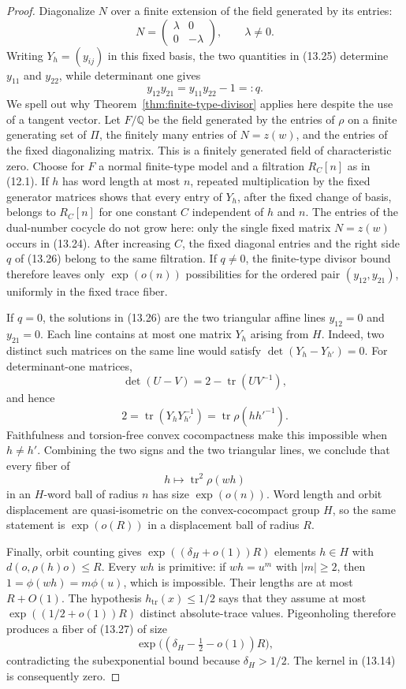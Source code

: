 \documentclass[11pt,reqno]{amsart}
\theoremstyle{definition}
\theoremstyle{remark}
\newcommand{\Q}{\mathbb Q}
\newcommand{\Tr}{\operatorname{tr}}
\begin{document}
\begin{proof}
Diagonalize \(N\) over a finite extension of the field generated by its
entries:
\[
 N=\begin{pmatrix}\lambda&0\\0&-\lambda\end{pmatrix},
 \qquad \lambda\ne0.
\]
Writing \(Y_h=(y_{ij})\) in this fixed basis, the two quantities in
(13.25) determine \(y_{11}\) and \(y_{22}\), while determinant one gives
\[
 y_{12}y_{21}=y_{11}y_{22}-1=:q.
\tag{13.26}
\]
We spell out why Theorem~\ref{thm:finite-type-divisor} applies here despite
the use of a tangent vector.  Let \(F/\Q\) be the field generated by the
entries of \(\rho\) on a finite generating set of \(\Pi\), the finitely
many entries of \(N=z(w)\), and the entries of the fixed diagonalizing
matrix.  This is a finitely generated field of characteristic zero.  Choose
for \(F\) a normal finite-type model and a filtration \(R_C[n]\) as in
(12.1).  If \(h\) has word length at most \(n\), repeated multiplication
by the fixed generator matrices shows that every entry of \(Y_h\), after
the fixed change of basis, belongs to \(R_C[n]\) for one constant \(C\)
independent of \(h\) and \(n\).  The entries of the dual-number cocycle do
not grow here: only the single fixed matrix \(N=z(w)\) occurs in (13.24).
After increasing \(C\), the fixed diagonal entries and the right side
\(q\) of (13.26) belong to the same filtration.  If \(q\ne0\), the
finite-type divisor bound therefore leaves only
\(\exp(o(n))\) possibilities for the ordered pair
\((y_{12},y_{21})\), uniformly in the fixed trace fiber.

If \(q=0\), the solutions in (13.26) are the two triangular affine lines
\(y_{12}=0\) and \(y_{21}=0\).  Each line contains at most one matrix
\(Y_h\) arising from \(H\).  Indeed, two distinct such matrices on the
same line would satisfy \(\det(Y_h-Y_{h'})=0\).  For determinant-one
matrices,
\[
 \det(U-V)=2-\Tr(UV^{-1}),
\]
and hence
\[
 2=\Tr(Y_hY_{h'}^{-1})
   =\Tr\rho(hh'^{-1}).
\]
Faithfulness and torsion-free convex cocompactness make this impossible
when \(h\ne h'\).  Combining the two signs and the two triangular lines,
we conclude that every fiber of
\[
 h\longmapsto\Tr^2\rho(wh)
\tag{13.27}
\]
in an \(H\)-word ball of radius \(n\) has size \(\exp(o(n))\).  Word
length and orbit displacement are quasi-isometric on the convex-cocompact
group \(H\), so the same statement is \(\exp(o(R))\) in a displacement
ball of radius \(R\).

Finally, orbit counting gives
\(\exp((\delta_H+o(1))R)\) elements \(h\in H\) with
\(d(o,\rho(h)o)\le R\).  Every \(wh\) is primitive: if
\(wh=u^m\) with \(|m|\ge2\), then
\(1=\phi(wh)=m\phi(u)\), which is impossible.  Their lengths are at most
\(R+O(1)\).  The hypothesis \(h_{\Tr}(x)\le1/2\) says that they assume at
most \(\exp((1/2+o(1))R)\) distinct absolute-trace values.  Pigeonholing
therefore produces a fiber of (13.27) of size
\[
 \exp\bigl((\delta_H-\tfrac12-o(1))R\bigr),
\]
contradicting the subexponential bound because \(\delta_H>1/2\).  The
kernel in (13.14) is consequently zero.
\end{proof}
\end{document}
